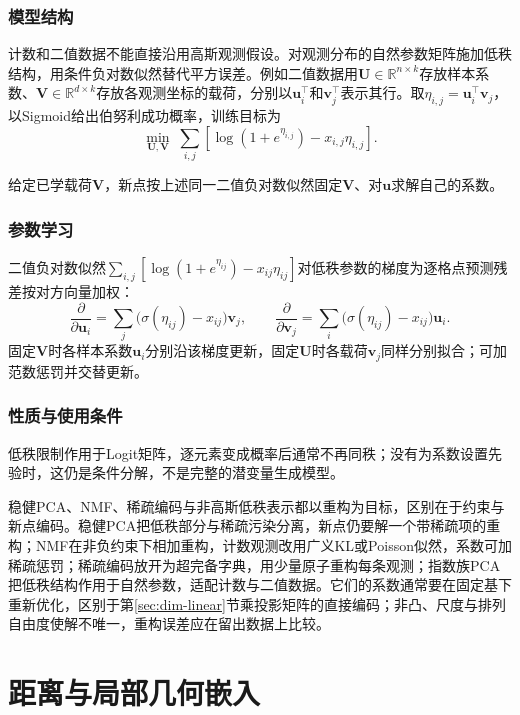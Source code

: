\subsubsection{模型结构}

计数和二值数据不能直接沿用高斯观测假设。对观测分布的自然参数矩阵施加低秩结构，用条件负对数似然替代平方误差。例如二值数据用$\bm U\in\mathbb R^{n\times k}$存放样本系数、$\bm V\in\mathbb R^{d\times k}$存放各观测坐标的载荷，分别以$\bm u_i^\top$和$\bm v_j^\top$表示其行。取$\eta_{i,j}=\bm u_i^\top\bm v_j$，以Sigmoid给出伯努利成功概率，训练目标为
\[
 \min_{\bm U,\bm V}\;
 \sum_{i,j}\left[\log(1+e^{\eta_{i,j}})-x_{i,j}\eta_{i,j}\right].
\]

给定已学载荷$\bm V$，新点按上述同一二值负对数似然固定$\bm V$、对$\bm u$求解自己的系数。

\subsubsection{参数学习}

二值负对数似然$\sum_{i,j}[\log(1+e^{\eta_{ij}})-x_{ij}\eta_{ij}]$对低秩参数的梯度为逐格点预测残差按对方向量加权：
\[
\frac{\partial}{\partial\bm u_i}
=\sum_j\bigl(\sigma(\eta_{ij})-x_{ij}\bigr)\bm v_j,\qquad
\frac{\partial}{\partial\bm v_j}
=\sum_i\bigl(\sigma(\eta_{ij})-x_{ij}\bigr)\bm u_i.
\]
固定$\bm V$时各样本系数$\bm u_i$分别沿该梯度更新，固定$\bm U$时各载荷$\bm v_j$同样分别拟合；可加范数惩罚并交替更新。

\subsubsection{性质与使用条件}

低秩限制作用于Logit矩阵，逐元素变成概率后通常不再同秩；没有为系数设置先验时，这仍是条件分解，不是完整的潜变量生成模型。

稳健PCA、NMF、稀疏编码与非高斯低秩表示都以重构为目标，区别在于约束与新点编码。稳健PCA把低秩部分与稀疏污染分离，新点仍要解一个带稀疏项的重构；NMF在非负约束下相加重构，计数观测改用广义KL或Poisson似然，系数可加稀疏惩罚；稀疏编码放开为超完备字典，用少量原子重构每条观测；指数族PCA把低秩结构作用于自然参数，适配计数与二值数据。它们的系数通常要在固定基下重新优化，区别于第\ref{sec:dim-linear}节乘投影矩阵的直接编码；非凸、尺度与排列自由度使解不唯一，重构误差应在留出数据上比较。

\section{距离与局部几何嵌入}
\label{sec:dim-distance}
\label{sec:dim-manifold}

